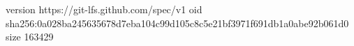 version https://git-lfs.github.com/spec/v1
oid sha256:0a028ba245635678d7eba104c99d105c8c5e21bf3971f691db1a0abe92b061d0
size 163429
